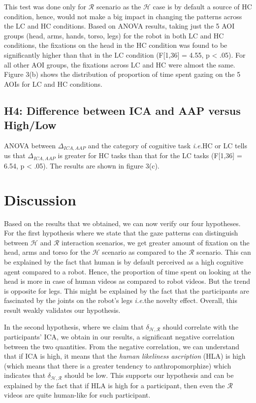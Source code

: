 \documentclass{acm_proc_article-sp}
\newcommand{\ie}{{\textit{i.e.\xspace}}}
\begin{document}
This test was done only for $\mathcal{R}$ scenario as the $\mathcal{H}$ case is
by default a source of HC condition, hence, would not make a big impact in
changing the patterns across the LC and HC conditions. Based on ANOVA results,
taking just the 5 AOI groups (head, arms, hands, torso, legs) for the robot in
both LC and HC conditions, the fixations on the head in the HC condition was
found to be significantly higher than that in the LC condition (F[1,36] = 4.55,
p < .05). For all other AOI groups, the fixations across LC and HC were almost
the same. Figure 3(b) shows the distribution of proportion of time spent gazing
on the 5 AOIs for LC and HC conditions.

\subsection{H4: Difference between ICA and AAP versus High/Low}

ANOVA between $\Delta_{ICA,AAP}$ and the category of cognitive task
\ie HC or LC tells us that $\Delta_{ICA,AAP}$ is greater for HC tasks
than that for the LC tasks (F[1,36] = 6.54, p < .05). The results are shown in
figure 3(c).


\section{Discussion}

Based on the results that we obtained, we can now verify our four hypotheses.
For the first hypothesis where we state that the gaze patterns can distinguish
between $\mathcal{H}$ and $\mathcal{R}$ interaction scenarios, we get greater
amount of fixation on the head, arms and torso for the $\mathcal{H}$ scenario as
compared to the $\mathcal{R}$ scenario. This can be explained by the fact that
human is by default perceived as a high cognitive agent compared to a robot.
Hence, the proportion of time spent on looking at the head is more in case of
human videos as compared to robot videos. But the trend is opposite for legs.
This might be explained by the fact that the participants are fascinated by the
joints on the robot's legs \ie the novelty effect. Overall, this
result weakly validates our hypothesis.

In the second hypothesis, where we claim that $\delta_{\mathcal{H},\mathcal{R}}$
should correlate with the participants' ICA, we obtain in our results, a
significant negative correlation between the two quantities. From the negative
correlation, we can understand that if ICA is high, it means that the
\textit{human likeliness ascription} (HLA) is high (which means that there is a
greater tendency to anthropomorphize) which indicates that
$\delta_{\mathcal{H},\mathcal{R}}$ should be low. This supports our hypothesis
and can be explained by the fact that if HLA is high for a participant, then
even the $\mathcal{R}$ videos are quite human-like for such participant. 
\end{document}
